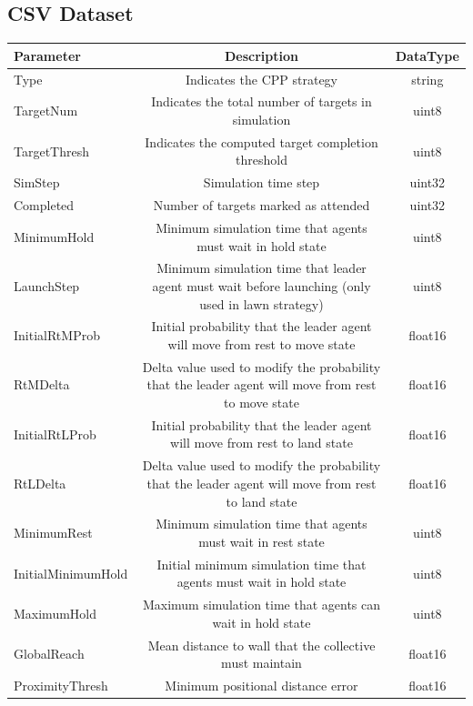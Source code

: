 \documentclass{report}
\begin{document}
\begin{appendices}

\chapter{CSV Dataset}
\begin{table}
	\begin{center}
		\footnotesize
		\begin{tabular}{|l|c|c|}
		\hline
		\textbf{Parameter} & \textbf{Description} & \textbf{DataType} \\
		\hline
		Type & Indicates the CPP strategy & string \\
		TargetNum & Indicates the total number of targets in simulation & uint8 \\
		TargetThresh & Indicates the computed target completion threshold & uint8 \\
		SimStep & Simulation time step & uint32 \\
		Completed & Number of targets marked as attended & uint32 \\
		MinimumHold & Minimum simulation time that agents must wait in hold state & uint8 \\
		LaunchStep & Minimum simulation time that leader agent must wait before launching (only used in lawn strategy) & uint8 \\
		InitialRtMProb & Initial probability that the leader agent will move from rest to move state & float16 \\
		RtMDelta & Delta value used to modify the probability that the leader agent will move from rest to move state & float16 \\
		InitialRtLProb & Initial probability that the leader agent will move from rest to land state & float16 \\
		RtLDelta  & Delta value used to modify the probability that the leader agent will move from rest to land state & float16 \\
		MinimumRest & Minimum simulation time that agents must wait in rest state & uint8 \\
		InitialMinimumHold & Initial minimum simulation time that agents must wait in hold state & uint8 \\
		MaximumHold  & Maximum simulation time that agents can wait in hold state & uint8 \\
		GlobalReach & Mean distance to wall that the collective must maintain & float16 \\
		ProximityThresh & Minimum positional distance error & float16 \\

\end{tabular}
\end{center}
\end{table}
\end{appendices}
\end{document}
